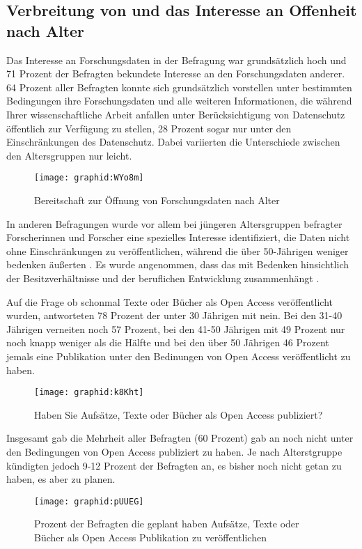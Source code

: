 \subsection{Verbreitung von und das Interesse an Offenheit nach Alter}

Das Interesse an Forschungsdaten in der Befragung war grundsätzlich hoch und 71 Prozent der Befragten bekundete Interesse an den Forschungsdaten anderer. 64 Prozent aller Befragten konnte sich grundsätzlich vorstellen unter bestimmten Bedingungen ihre Forschungsdaten und alle weiteren Informationen, die während Ihrer wissenschaftliche Arbeit anfallen unter Berücksichtigung von Datenschutz öffentlich zur Verfügung zu stellen, 28 Prozent sogar nur unter den Einschränkungen des Datenschutz. Dabei variierten die Unterschiede zwischen den Altersgruppen nur leicht.

\begin{figure}[h!]
\texttt{[image: graphid:WYo8m]}
\caption{Bereitschaft zur Öffnung von Forschungsdaten nach Alter}
\end{figure}

In anderen Befragungen wurde vor allem bei jüngeren Altersgruppen befragter Forscherinnen und Forscher eine spezielles Interesse identifiziert, die Daten nicht ohne Einschränkungen zu veröffentlichen, während die über 50-Jährigen weniger bedenken äußerten \cite{Tenopir_2011}. Es wurde angenommen, dass das mit Bedenken hinsichtlich der Besitzverhältnisse und der beruflichen Entwicklung zusammenhängt \cite{Tenopir_2011}.

Auf die Frage ob schonmal Texte oder Bücher als Open Access veröffentlicht wurden, antworteten 78 Prozent der unter 30 Jährigen mit nein. Bei den 31-40 Jährigen verneiten noch 57 Prozent, bei den 41-50 Jährigen mit 49 Prozent nur noch knapp weniger als die Hälfte und bei den über 50 Jährigen 46 Prozent jemals eine Publikation unter den Bedinungen von Open Access veröffentlicht zu haben.

\begin{figure}[h!]
\texttt{[image: graphid:k8Kht]}
\caption{Haben Sie Aufsätze, Texte oder Bücher als Open Access publiziert?}
\end{figure}

Insgesamt gab die Mehrheit aller Befragten (60 Prozent) gab an noch nicht unter den Bedingungen von Open Access publiziert zu haben. Je nach Alterstgruppe kündigten jedoch 9-12 Prozent der Befragten an, es bisher noch nicht getan zu haben, es aber zu planen.

\begin{figure}[h!]
\texttt{[image: graphid:pUUEG]}
\caption{Prozent der Befragten die geplant haben Aufsätze, Texte oder Bücher als Open Access Publikation zu veröffentlichen}
\end{figure}

